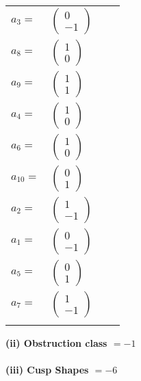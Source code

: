 \documentclass[1p]{elsarticle_modified}
\theoremstyle{definition}
\begin{document}
\begin{tabular}{m{7pt} m{180pt} m{7pt} m{180pt} }
\flushright $a_{3}=$&$\begin{pmatrix}0\\-1\end{pmatrix}$ \\
\flushright $a_{8}=$&$\begin{pmatrix}1\\0\end{pmatrix}$ \\
\flushright $a_{9}=$&$\begin{pmatrix}1\\1\end{pmatrix}$ \\
\flushright $a_{4}=$&$\begin{pmatrix}1\\0\end{pmatrix}$ \\
\flushright $a_{6}=$&$\begin{pmatrix}1\\0\end{pmatrix}$ \\
\flushright $a_{10}=$&$\begin{pmatrix}0\\1\end{pmatrix}$ \\
\flushright $a_{2}=$&$\begin{pmatrix}1\\-1\end{pmatrix}$ \\
\flushright $a_{1}=$&$\begin{pmatrix}0\\-1\end{pmatrix}$ \\
\flushright $a_{5}=$&$\begin{pmatrix}0\\1\end{pmatrix}$ \\
\flushright $a_{7}=$&$\begin{pmatrix}1\\-1\end{pmatrix}$\\&\end{tabular}
\flushleft \textbf{(ii) Obstruction class $= -1$}\\~\\
\flushleft \textbf{(iii) Cusp Shapes $= -6$}\\~\\
\end{document}
